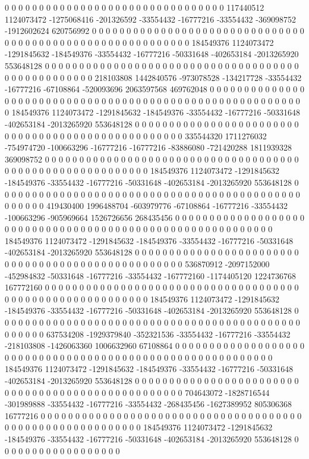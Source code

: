 0 0 0 0 0 0 0 0 0 0 0 0 0 0 0 0 0 0 0 0 0 0 0 0 0 0 0 0 0 0 0 0 117440512 1124073472 -1275068416 -201326592 -33554432 -16777216 -33554432 -369098752 -1912602624 620756992 0 0 0 0 0 0 0 0 0 0 0 0 0 0 0 0 0 0 0 0 0 0 0 0 0 0 0 0 0 0 0 0 0 0 0 0 0 0 0 0 0 0 0 0 0 0 0 0 0 0 0 0 0 0 0 0 0 0 184549376 1124073472 -1291845632 -184549376 -33554432 -16777216 -50331648 -402653184 -2013265920 553648128 0 0 0 0 0 0 0 0 0 0 0 0 0 0 0 0 0 0
0 0 0 0 0 0 0 0 0 0 0 0 0 0 0 0 0 0 0 0 0 0 0 0 0 0 0 0 0 0 0 0 218103808 1442840576 -973078528 -134217728 -33554432 -16777216 -67108864 -520093696 2063597568 469762048 0 0 0 0 0 0 0 0 0 0 0 0 0 0 0 0 0 0 0 0 0 0 0 0 0 0 0 0 0 0 0 0 0 0 0 0 0 0 0 0 0 0 0 0 0 0 0 0 0 0 0 0 0 0 0 0 0 0 184549376 1124073472 -1291845632 -184549376 -33554432 -16777216 -50331648 -402653184 -2013265920 553648128 0 0 0 0 0 0 0 0 0 0 0 0 0 0 0 0 0 0
0 0 0 0 0 0 0 0 0 0 0 0 0 0 0 0 0 0 0 0 0 0 0 0 0 0 0 0 0 0 0 0 335544320 1711276032 -754974720 -100663296 -16777216 -16777216 -83886080 -721420288 1811939328 369098752 0 0 0 0 0 0 0 0 0 0 0 0 0 0 0 0 0 0 0 0 0 0 0 0 0 0 0 0 0 0 0 0 0 0 0 0 0 0 0 0 0 0 0 0 0 0 0 0 0 0 0 0 0 0 0 0 0 0 184549376 1124073472 -1291845632 -184549376 -33554432 -16777216 -50331648 -402653184 -2013265920 553648128 0 0 0 0 0 0 0 0 0 0 0 0 0 0 0 0 0 0
0 0 0 0 0 0 0 0 0 0 0 0 0 0 0 0 0 0 0 0 0 0 0 0 0 0 0 0 0 0 0 0 419430400 1996488704 -603979776 -67108864 -16777216 -33554432 -100663296 -905969664 1526726656 268435456 0 0 0 0 0 0 0 0 0 0 0 0 0 0 0 0 0 0 0 0 0 0 0 0 0 0 0 0 0 0 0 0 0 0 0 0 0 0 0 0 0 0 0 0 0 0 0 0 0 0 0 0 0 0 0 0 0 0 184549376 1124073472 -1291845632 -184549376 -33554432 -16777216 -50331648 -402653184 -2013265920 553648128 0 0 0 0 0 0 0 0 0 0 0 0 0 0 0 0 0 0
0 0 0 0 0 0 0 0 0 0 0 0 0 0 0 0 0 0 0 0 0 0 0 0 0 0 0 0 0 0 0 0 536870912 -2097152000 -452984832 -50331648 -16777216 -33554432 -167772160 -1174405120 1224736768 167772160 0 0 0 0 0 0 0 0 0 0 0 0 0 0 0 0 0 0 0 0 0 0 0 0 0 0 0 0 0 0 0 0 0 0 0 0 0 0 0 0 0 0 0 0 0 0 0 0 0 0 0 0 0 0 0 0 0 0 184549376 1124073472 -1291845632 -184549376 -33554432 -16777216 -50331648 -402653184 -2013265920 553648128 0 0 0 0 0 0 0 0 0 0 0 0 0 0 0 0 0 0
0 0 0 0 0 0 0 0 0 0 0 0 0 0 0 0 0 0 0 0 0 0 0 0 0 0 0 0 0 0 0 0 637534208 -1929379840 -352321536 -33554432 -16777216 -33554432 -218103808 -1426063360 1006632960 67108864 0 0 0 0 0 0 0 0 0 0 0 0 0 0 0 0 0 0 0 0 0 0 0 0 0 0 0 0 0 0 0 0 0 0 0 0 0 0 0 0 0 0 0 0 0 0 0 0 0 0 0 0 0 0 0 0 0 0 184549376 1124073472 -1291845632 -184549376 -33554432 -16777216 -50331648 -402653184 -2013265920 553648128 0 0 0 0 0 0 0 0 0 0 0 0 0 0 0 0 0 0
0 0 0 0 0 0 0 0 0 0 0 0 0 0 0 0 0 0 0 0 0 0 0 0 0 0 0 0 0 0 0 0 704643072 -1828716544 -301989888 -33554432 -16777216 -33554432 -268435456 -1627389952 805306368 16777216 0 0 0 0 0 0 0 0 0 0 0 0 0 0 0 0 0 0 0 0 0 0 0 0 0 0 0 0 0 0 0 0 0 0 0 0 0 0 0 0 0 0 0 0 0 0 0 0 0 0 0 0 0 0 0 0 0 0 184549376 1124073472 -1291845632 -184549376 -33554432 -16777216 -50331648 -402653184 -2013265920 553648128 0 0 0 0 0 0 0 0 0 0 0 0 0 0 0 0 0 0
